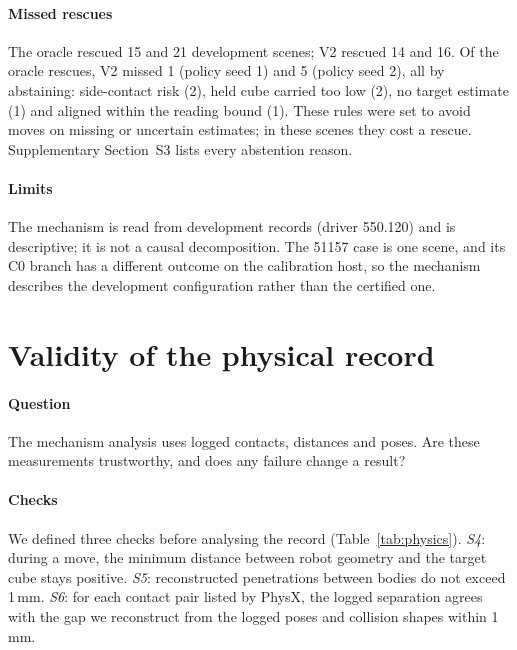 \documentclass[preprint,12pt]{elsarticle}
\newcommand{\tabdir}{../tables/}
\begin{document}
\paragraph{Missed rescues} The oracle rescued 15 and 21 development scenes; V2 rescued 14 and 16. Of the oracle rescues, V2 missed 1 (policy seed 1) and 5 (policy seed 2), all by abstaining: side-contact risk (2), held cube carried too low (2), no target estimate (1) and aligned within the reading bound (1). These rules were set to avoid moves on missing or uncertain estimates; in these scenes they cost a rescue. Supplementary Section~S3 lists every abstention reason.

\paragraph{Limits} The mechanism is read from development records (driver 550.120) and is descriptive; it is not a causal decomposition. The 51157 case is one scene, and its C0 branch has a different outcome on the calibration host, so the mechanism describes the development configuration rather than the certified one.

\section{Validity of the physical record}\label{sec:physics}

\paragraph{Question} The mechanism analysis uses logged contacts, distances and poses. Are these measurements trustworthy, and does any failure change a result?

\begin{table}[!htbp]
\centering\footnotesize
\caption{Measurement-validity checks on the development record (post hoc unless stated). S4--S6 were declared before the analysis; their official status is kept.}\label{tab:physics}

\end{table}

\paragraph{Checks} We defined three checks before analysing the record (Table~\ref{tab:physics}). \emph{S4}: during a move, the minimum distance between robot geometry and the target cube stays positive. \emph{S5}: reconstructed penetrations between bodies do not exceed 1\,mm. \emph{S6}: for each contact pair listed by PhysX, the logged separation agrees with the gap we reconstruct from the logged poses and collision shapes within 1\,mm.
\end{document}
